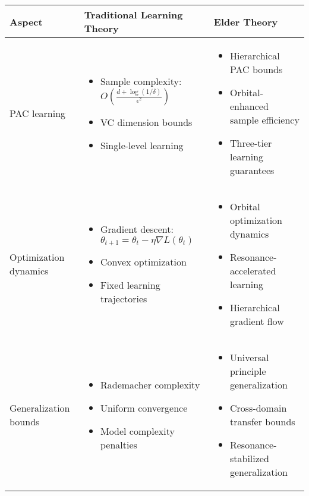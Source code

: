 \begin{table}[h]
\centering
\begin{tabular}{|p{3cm}|p{5cm}|p{5cm}|}
\hline
\textbf{Aspect} & \textbf{Traditional Learning Theory} & \textbf{Elder Theory} \\
\hline
PAC learning & 
\begin{itemize}
    \item Sample complexity: $O\left(\frac{d + \log(1/\delta)}{\epsilon^2}\right)$
    \item VC dimension bounds
    \item Single-level learning
\end{itemize} &
\begin{itemize}
    \item Hierarchical PAC bounds
    \item Orbital-enhanced sample efficiency
    \item Three-tier learning guarantees
\end{itemize} \\
\hline
Optimization dynamics & 
\begin{itemize}
    \item Gradient descent: $\theta_{t+1} = \theta_t - \eta \nabla L(\theta_t)$
    \item Convex optimization
    \item Fixed learning trajectories
\end{itemize} &
\begin{itemize}
    \item Orbital optimization dynamics
    \item Resonance-accelerated learning
    \item Hierarchical gradient flow
\end{itemize} \\
\hline
Generalization bounds & 
\begin{itemize}
    \item Rademacher complexity
    \item Uniform convergence
    \item Model complexity penalties
\end{itemize} &
\begin{itemize}
    \item Universal principle generalization
    \item Cross-domain transfer bounds
    \item Resonance-stabilized generalization
\end{itemize} \\

\end{tabular}
\end{table}

